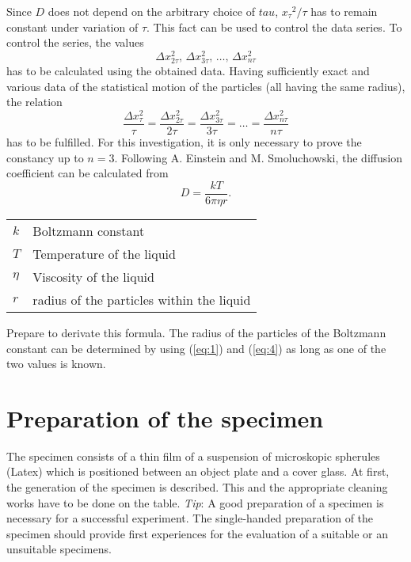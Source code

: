 \documentclass{tudphygp_eng}
\begin{document}
Since $D$ does not depend on the arbitrary choice of $tau$, ${x{_\tau}^2}/\tau$ has to remain constant under variation of $\tau$. This fact can be used to control the data series. To control the series, the values 
\begin{equation}
\label{eq:2}
 \Delta x_{2\tau}^2, \, \Delta x_{3\tau}^2, \, \ldots, \, \Delta x_{n\tau}^2
\end{equation}
has to be calculated using the obtained data. Having sufficiently exact and various data of the statistical motion of the particles (all having the same radius), the relation
\begin{equation}
\label{eq:3}
 \frac{\Delta x_\tau^2}{\tau}= \frac{\Delta x_{2\tau}^2}{2\tau} = \frac{\Delta x_{3\tau}^2}{3\tau} = \ldots = \frac{\Delta x_{n\tau}^2}{n\tau}
\end{equation}
has to be fulfilled. For this investigation, it is only necessary to prove the constancy up to $n=3$. Following A. Einstein and M. Smoluchowski, the diffusion coefficient can be calculated from
\begin{equation}
\label{eq:4}
 D=\frac{kT}{6\pi\eta r} . 
\end{equation}
\begin{tabular}{l@{\, -- \,}l}
$k$ & Boltzmann constant \\
$T$ & Temperature of the liquid \\
$\eta$ & Viscosity of the liquid \\
$r$ & radius of the particles within the liquid  
\end{tabular}

Prepare to derivate this formula. The radius of the particles of the Boltzmann constant can be determined by using (\ref{eq:1}) and (\ref{eq:4}) as long as one of the two values is known.

\section{Preparation of the specimen}

The specimen consists of a thin film of a suspension of microskopic spherules (Latex) which is positioned between an object plate and a cover glass. At first, the generation of the specimen is described. This and the appropriate cleaning works have to be done on the table. \emph{Tip}: A good preparation of a specimen is necessary for a successful experiment. The single-handed preparation of the specimen should provide first experiences for the evaluation of a suitable or an unsuitable specimens.
\end{document}
